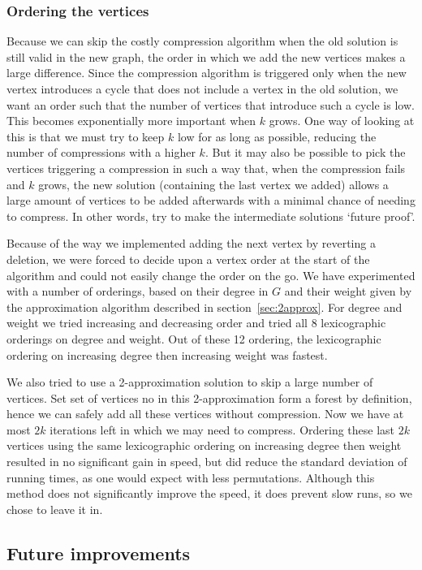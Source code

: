 \subsubsection{Ordering the vertices} \label{sec:order}
Because we can skip the costly compression algorithm when the old solution is
still valid in the new graph, the order in which we add the new vertices makes a large difference. Since the compression
algorithm is triggered only when the new vertex introduces a cycle that does not include a vertex in the old solution,
we want an order such that the number of vertices that introduce such a cycle is low. This becomes exponentially more important when $k$ grows. One way of looking at this is that we must try to keep $k$ low for as long as possible, reducing the number of compressions with a higher $k$. But it may also be possible to pick the vertices triggering a compression in such a way that, when the compression fails and $k$ grows, the new solution (containing the last vertex we added) allows a large amount of vertices to be added afterwards with a minimal chance of needing to compress. In other words, try to make the intermediate solutions `future proof'.

Because of the way we implemented adding the next vertex by reverting a deletion, we were forced to decide upon a vertex
order at the start of the algorithm and could not easily change the order on the go. We have experimented with a number of
orderings, based on their degree in $G$ and their weight given by the approximation algorithm described in 
section~\ref{sec:2approx}. For degree and weight we tried increasing and decreasing order and tried
all 8 lexicographic orderings on degree and weight. Out of these 12 ordering, the lexicographic ordering on increasing
degree then increasing weight was fastest.

We also tried to use a 2-approximation solution to skip a large number of vertices. Set set of vertices no in this
2-approximation form a forest by definition, hence we can safely add all these vertices without compression. Now we have
at most $2k$ iterations left in which we may need to compress. Ordering these last $2k$ vertices using the same
lexicographic ordering on increasing degree then weight resulted in no significant gain in speed, but did reduce the standard deviation of running times, as one would expect with less permutations. Although this method does not significantly improve the speed, it does prevent slow runs, so we chose to leave it in.

\subsection{Future improvements}
